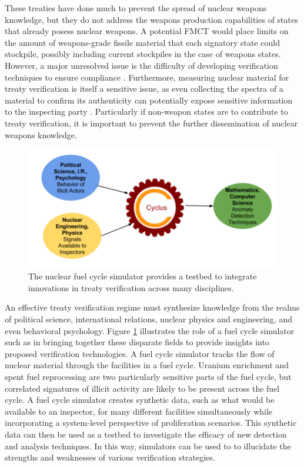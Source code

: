 These treaties have done much to prevent the spread of nuclear weapons knowledge, but they do not address the weapons production capabilities of states that already posess nuclear weapons.  A potential \gls{FMCT} would place limits on the amount of weapons-grade fissile material that each signatory state could stockpile, possibly including current stockpiles in the case of weapons states.  However, a major unresolved issue is the difficulty of developing verification techniques to ensure compliance \cite{_fissile_2013}.  Furthermore, measuring nuclear material for treaty verification is itself a sensitive issue, as even collecting the spectra of a material to confirm its authenticity can potentially expose sensitive information to the inspecting party \cite{glaser_zero-knowledge_2014}. Particularly if non-weapon states are to contribute to treaty verification, it is important to prevent the further dissemination of nuclear weapons knowledge.

\begin{figure}%
\begin{center}
\includegraphics[natwidth=162bp,natheight=227bp, scale=0.45]{./figs/cyclus_interdiscipline.png}
\end{center}
\caption{The \Cyclus nuclear fuel cycle simulator provides a testbed to integrate innovations in treaty verification across many disciplines.}
\label{fig:cyclus_diagram}
\end{figure}

An effective treaty verification regime must synthesize knowledge from the realms of political science, international relations, nuclear physics and engineering, and even behavioral psychology.  Figure \ref{fig:cyclus_diagram} illustrates  the role of a fuel cycle simulator such as \Cyclus in bringing together these disparate fields to provide insights into proposed verification technologies. A fuel cycle simulator tracks the flow of nuclear material through the facilities in a fuel cycle\cite{huff_fundamental_2016}.  Uranium enrichment and spent fuel reprocessing are two particularly sensitive parts of the fuel cycle, but correlated signatures of illicit activity are likely to be present across the fuel cycle. A fuel cycle simulator creates synthetic data, such as what would be available to an inspector, for many different facilities simultaneously while incorporating a system-level perspective of proliferation scenarios. This synthetic data can then be used as a testbed to investigate the efficacy of new detection and analysis techniques. In this way, simulators can be used to  to illucidate the strengths and weaknesses of various verification strategies.